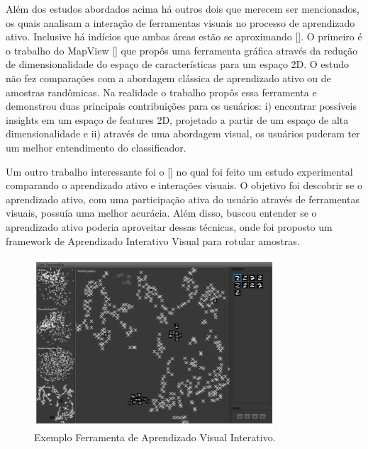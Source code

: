 Além dos estudos abordados acima há outros dois que merecem ser mencionados, os quais analisam a interação de ferramentas visuais no processo de aprendizado ativo. Inclusive há indícios que ambas áreas estão se aproximando [\cite{sacha2016human}]. O primeiro é o trabalho do MapView [\cite{weigl2016mapview}] que propôs uma ferramenta gráfica através da redução de dimensionalidade do espaço de características para um espaço 2D. O estudo não fez comparações com a abordagem clássica de aprendizado ativo ou de amostras randômicas. Na realidade o trabalho propôs essa ferramenta e demonstrou duas principais contribuições para os usuários: i) encontrar possíveis insights em um espaço de features 2D, projetado a partir de um espaço de alta dimensionalidade e ii) através de uma abordagem visual, os usuários puderam ter um melhor entendimento do classificador. 

Um outro trabalho interessante foi o [\cite{bernard2018comparing}] no qual foi feito um estudo experimental comparando o aprendizado ativo e interações visuais. O objetivo foi descobrir se o aprendizado ativo, com uma participação ativa do usuário através de ferramentas visuais, possuía uma melhor acurácia. Além disso, buscou entender se o aprendizado ativo poderia aproveitar dessas técnicas, onde foi proposto um framework de Aprendizado Interativo Visual para rotular amostras. 

\begin{figure}
  \centering
  \includegraphics[width=0.8\textwidth]{figures/visual_comparing.png}
  \caption{Exemplo Ferramenta de Aprendizado Visual Interativo.}
  \label{fig:visual_comparing}
\end{figure}


